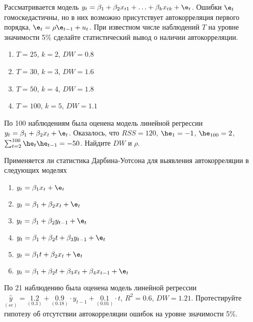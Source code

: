 \documentclass[pdftex,11pt,openany]{book}\usepackage[]{graphicx}\usepackage[]{color}
\begin{document}
\begin{problem}
Рассматривается модель $y_t=\beta_1+\beta_2 x_{t1}+\ldots+\beta_k x_{tk}+\e_t$. Ошибки $\e_t$ гомоскедастичны, но в них возможно присутствует автокорреляция первого порядка, $\e_t=\rho \e_{t-1}+u_t$. При известном числе наблюдений $T$ на уровне значимости 5\% сделайте статистический вывод о наличии автокорреляции.
\begin{enumerate}
\item $T=25$, $k=2$, $DW=0.8$
\item $T=30$, $k=3$, $DW=1.6$
\item $T=50$, $k=4$, $DW=1.8$
\item $T=100$, $k=5$, $DW=1.1$
\end{enumerate}
\end{problem}

\begin{solution}
\end{solution}


\begin{problem}
По 100 наблюдениям была оценена модель линейной регрессии
$y_t=\beta_1+\beta_2 x_t+\e_t$. Оказалось, что $RSS=120$, $\he_1=-1$, $\he_{100}=2$, $\sum_{t=2}^{100} \he_t\he_{t-1}=-50$. Найдите $DW$ и $\rho$.
\end{problem}

\begin{solution}
\end{solution}


\begin{problem}
Применяется ли статистика Дарбина-Уотсона для выявления автокорреляции в следующих моделях
\begin{enumerate}
\item $y_t=\beta_1 x_t + \e_t$
\item $y_t=\beta_1 + \beta_2 x_t + \e_t$
\item $y_t=\beta_1 + \beta_2 y_{t-1} + \e_t$
\item $y_t=\beta_1 + \beta_2 t +\beta_3 y_{t-1} + \e_t$
\item $y_t=\beta_1 t + \beta_2 x_t + \e_t$
\item $y_t=\beta_1 + \beta_2 t +\beta_3 x_t +\beta_4 x_{t-1} + \e_t$
\end{enumerate}
\end{problem}

\begin{solution}
\end{solution}


\begin{problem}
По 21 наблюдению была оценена модель линейной регрессии
$\underset{(se)}{\hat{y}}=\underset{(0.3)}{1.2}+\underset{(0.18)}{0.9}\cdot y_{t-1}+\underset{(0.01)}{0.1}\cdot t$, $R^2=0.6$, $DW=1.21$. Протестируйте гипотезу об отсутствии автокорреляции ошибок на уровне значимости 5\%.
\end{problem}
\end{document}
